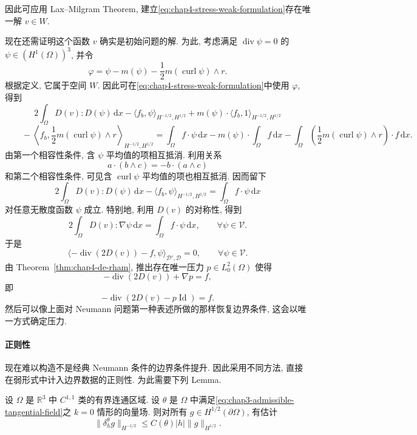 因此可应用 Lax--Milgram Theorem, 建立\eqref{eq:chap4-stress-weak-formulation}存在唯一解 $v\in W$.

现在还需证明这个函数 $v$ 确实是初始问题的解. 为此, 考虑满足 $\operatorname{div}\psi=0$ 的 $\psi\in(H^1(\Omega))^3$, 并令
\[
 \varphi=\psi-m(\psi)-\frac12m(\operatorname{curl}\psi)\wedge r.
\]
根据定义, 它属于空间 $W$. 因此可在\eqref{eq:chap4-stress-weak-formulation}中使用 $\varphi$, 得到
\[
 2\int_\Omega D(v):D(\psi)\,\mathrm dx
 -\langle f_b,\psi\rangle_{H^{-1/2},H^{1/2}}
 +m(\psi)\cdot\langle f_b,1\rangle_{H^{-1/2},H^{1/2}}
\]
\[
 \qquad-\left\langle f_b,\frac12m(\operatorname{curl}\psi)\wedge r\right\rangle_{H^{-1/2},H^{1/2}}
 =\int_\Omega f\cdot\psi\,\mathrm dx
 -m(\psi)\cdot\int_\Omega f\,\mathrm dx
 -\int_\Omega\left(\frac12m(\operatorname{curl}\psi)\wedge r\right)\cdot f\,\mathrm dx.
\]
由第一个相容性条件, 含 $\psi$ 平均值的项相互抵消. 利用关系
\[
 a\cdot(b\wedge c)=-b\cdot(a\wedge c)
\]
和第二个相容性条件, 可见含 $\operatorname{curl}\psi$ 平均值的项也相互抵消. 因而留下
\[
 2\int_\Omega D(v):D(\psi)\,\mathrm dx
 -\langle f_b,\psi\rangle_{H^{-1/2},H^{1/2}}
 =\int_\Omega f\cdot\psi\,\mathrm dx
\]
对任意无散度函数 $\psi$ 成立. 特别地, 利用 $D(v)$ 的对称性, 得到
\[
 2\int_\Omega D(v):\nabla\psi\,\mathrm dx
 =\int_\Omega f\cdot\psi\,\mathrm dx,
 \qquad\forall\psi\in\mathcal V.
\]
于是
\[
 \langle-\operatorname{div}(2D(v))-f,\psi\rangle_{\mathcal D',\mathcal D}=0,
 \qquad\forall\psi\in\mathcal V.
\]
由 Theorem~\ref{thm:chap4-de-rham}, 推出存在唯一压力 $p\in L_0^2(\Omega)$ 使得
\[
 -\operatorname{div}(2D(v))+\nabla p=f,
\]
即
\[
 -\operatorname{div}(2D(v)-p\operatorname{Id})=f.
\]
然后可以像上面对 Neumann 问题第一种表述所做的那样恢复边界条件, 这会以唯一方式确定压力.

\paragraph{正则性}
\label{subsubsec:chap4-stress-regularity}

现在难以构造不是经典 Neumann 条件的边界条件提升. 因此采用不同方法, 直接在弱形式中计入边界数据的正则性. 为此需要下列 Lemma.

\begin{Lemma}
\label{lem:chap4-boundary-tangential-difference}
设 $\Omega$ 是 $\mathbb R^3$ 中 $C^{1,1}$ 类的有界连通区域. 设 $\theta$ 是 $\Omega$ 中满足\eqref{eq:chap3-admissible-tangential-field}之 $k=0$ 情形的向量场. 则对所有 $g\in H^{1/2}(\partial\Omega)$, 有估计
\[
 \|\delta_h^\theta g\|_{H^{-1/2}}
 \leq C(\theta)|h|\|g\|_{H^{1/2}}.
\]
\end{Lemma}


